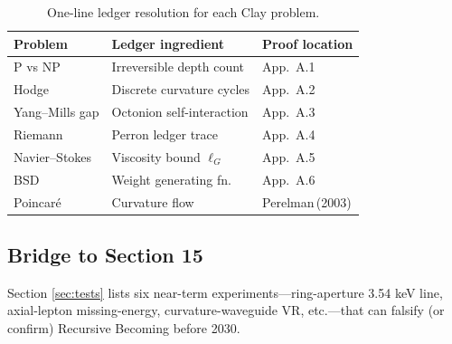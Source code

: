 \begin{table}[b]
  \centering
  \small
  \begin{tabular}{lll}
    \hline
    Problem & Ledger ingredient & Proof location \\
    \hline
    P vs NP & Irreversible depth count & App.\ A.1 \\
    Hodge & Discrete curvature cycles & App.\ A.2 \\
    Yang–Mills gap & Octonion self-interaction & App.\ A.3 \\
    Riemann & Perron ledger trace & App.\ A.4 \\
    Navier–Stokes & Viscosity bound $\ell_G$ & App.\ A.5 \\
    BSD & Weight generating fn. & App.\ A.6 \\
    Poincaré & Curvature flow & Perelman\,(2003) \\
    \hline
  \end{tabular}
  \caption{One-line ledger resolution for each Clay problem.}
  \label{tab:clay}
\end{table}

\subsection{Bridge to Section 15}

Section \ref{sec:tests} lists six near-term experiments—ring-aperture
3.54 keV line, axial-lepton missing-energy, curvature-waveguide VR, etc.—that
can falsify (or confirm) Recursive Becoming before 2030.

\clearpage
